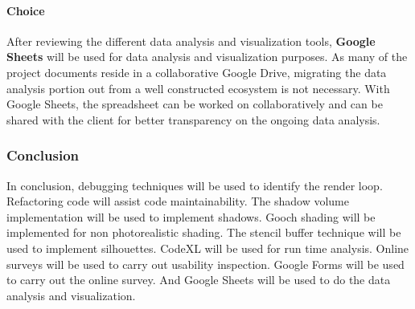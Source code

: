 \paragraph{Choice}
After reviewing the different data analysis and visualization tools, \textbf{Google Sheets} will be used for data analysis and visualization purposes.
As many of the project documents reside in a collaborative Google Drive, migrating the data analysis portion out from a well constructed ecosystem is not necessary.
With Google Sheets, the spreadsheet can be worked on collaboratively and can be shared with the client for better transparency on the ongoing data analysis. 

\newpage

\subsubsection{Conclusion}
In conclusion, debugging techniques will be used to identify the render loop.
Refactoring code will assist code maintainability.
The shadow volume implementation will be used to implement shadows.
Gooch shading will be implemented for non photorealistic shading.
The stencil buffer technique will be used to implement silhouettes.
CodeXL will be used for run time analysis.
Online surveys will be used to carry out usability inspection.
Google Forms will be used to carry out the online survey.
And Google Sheets will be used to do the data analysis and visualization.


